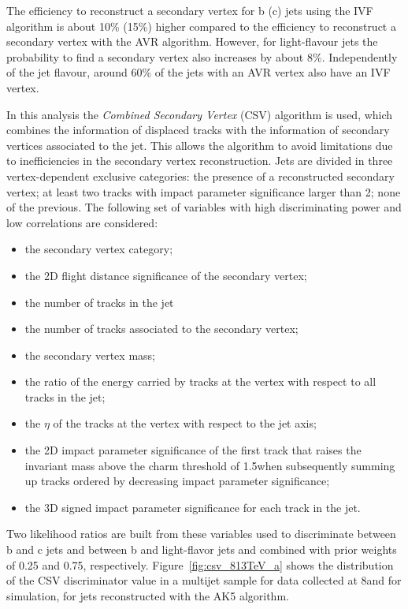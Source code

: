  The efficiency to reconstruct a secondary vertex for b (c) jets using the IVF algorithm is about 10\% (15\%) higher compared to the efficiency to reconstruct a secondary vertex with the AVR algorithm. However, for light-flavour jets the probability to find a secondary vertex also increases by about 8\%. Independently of the jet flavour, around 60\% of the jets with an AVR vertex also have an IVF vertex.
 
In this analysis the {\itshape Combined Secondary Vertex} (CSV) algorithm is used, which combines the information of displaced tracks with the information of secondary vertices associated to the jet.
This allows the algorithm to avoid limitations due to inefficiencies in the secondary vertex reconstruction. Jets are divided in three vertex-dependent exclusive categories: the presence of a reconstructed secondary vertex; at least two tracks with impact parameter significance larger than 2; none of the previous. The following set of variables with high discriminating power and low correlations are considered:

\begin{itemize}
\item the secondary vertex category;
\item the 2D flight distance significance of the secondary vertex;
\item the number of tracks in the jet
\item the number of tracks associated to the secondary vertex;
\item the secondary vertex mass;
\item the ratio of the energy carried by tracks at the vertex with respect to all tracks in the jet;
\item the $\eta$ of the tracks at the vertex with respect to the jet axis;
\item the 2D impact parameter significance of the first track that raises the invariant mass above the charm threshold of 1.5\GeV when subsequently summing up tracks ordered by decreasing impact parameter significance;
\item the 3D signed impact parameter significance for each track in the jet.
\end{itemize}

Two likelihood ratios are built from these variables used to discriminate between b and c jets and between b and light-flavor jets and combined with prior weights of 0.25 and 0.75, respectively. Figure~\ref{fig:csv_813TeV_a} shows the distribution of the CSV discriminator value in a multijet sample for data collected at 8\TeV and for simulation, for jets reconstructed with the AK5 algorithm.

